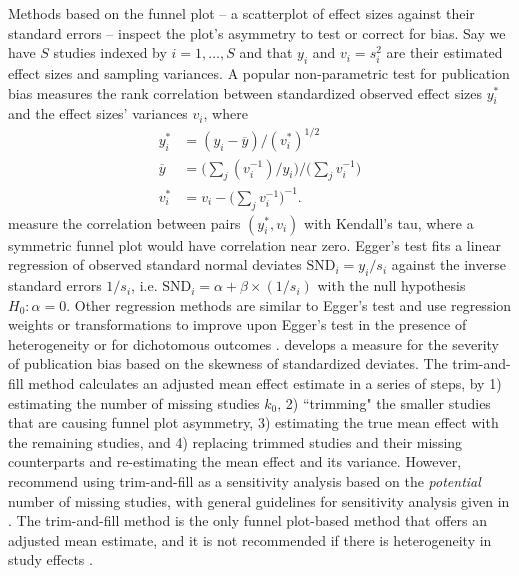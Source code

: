 \documentclass[12pt]{article}   	%
\numberwithin{equation}{section}
\begin{document}
Methods based on the funnel plot \citep{light1984funnel} -- a scatterplot of effect sizes against their standard errors -- inspect the plot's asymmetry to test or correct for bias. Say we have $S$ studies indexed by $i = 1,\dots,S$ and that ${y_i}$ and ${v_i} = {s_i^2}$ are their estimated effect sizes and sampling variances. A popular non-parametric test for publication bias \citep{begg1994test} measures the rank correlation between standardized observed effect sizes $y_i^*$ and the effect sizes' variances $v_i$, where 
\begin{align}
y_i^* &= (y_i - \overline{y}) / (v_i^*)^{1/2} \nonumber \\
\overline{y} &= \Big( \sum_j (v_i^{-1})/ y_i \Big) / \Big( \sum_j v_i^{-1} \Big) \nonumber \\
v_i^* &= v_i - \Big( \sum_j v_i^{-1} \Big)^{-1}. \nonumber
\end{align}
\citet{begg1994test} measure the correlation between pairs $(y_i^*, v_i)$ with Kendall's tau, where a symmetric funnel plot would have correlation near zero. Egger's test \citep{egger1997test} fits a linear regression of observed standard normal deviates $\text{SND}_i = y_i / s_i$ against the inverse standard errors $1 / s_i$, i.e. $\text{SND}_i = \alpha + \beta \times (1 / s_i)$  with the null hypothesis $H_0: \alpha = 0$. Other regression methods \citep{macaskill2001test, rucker2008arcsine, thompson1999test, peters2006test} are similar to Egger's test and use regression weights or transformations to improve upon Egger's test in the presence of heterogeneity or for dichotomous outcomes \citep{jin2015methods}. \citet{lin2018test} develops a measure for the severity of publication bias based on the skewness of standardized deviates. The trim-and-fill method \citep{duval2000biom} calculates an adjusted mean effect estimate in a series of steps, by 1) estimating the number of missing studies $k_0$, 2) ``trimming" the smaller studies that are causing funnel plot asymmetry, 3) estimating the true mean effect with the remaining studies, and 4) replacing trimmed studies and their missing counterparts and re-estimating the mean effect and its variance. However, \citet{duval2000biom} recommend using trim-and-fill as a sensitivity analysis based on the \textit{potential} number of missing studies, with general guidelines for sensitivity analysis given in \citet{shi2019trim}. The trim-and-fill method is the only funnel plot-based method that offers an adjusted mean estimate, and it is not recommended if there is heterogeneity in study effects \citep{jin2015methods}.
\end{document}
